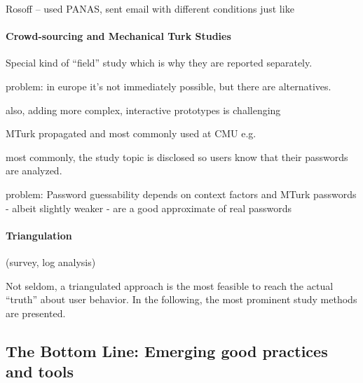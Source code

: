 Rosoff \etal \cite{Rosoff2014BehavioralExperimentsFraud} -- used PANAS, sent email with different conditions just like \cite{Huh2017TooBusy}


\paragraph{Crowd-sourcing and Mechanical Turk Studies}
Special kind of ``field'' study which is why they are reported separately.

problem: in europe it's not immediately possible, but there are alternatives. 

also, adding more complex, interactive prototypes is challenging

\cite{Peer2017BeyondTheTurk}
\cite{Ross2010WhoAreTurkers}
\cite{Savage2012GainingWisdomCrowds}

MTurk
propagated and most commonly used at CMU e.g. \cite{Mazurek2013Measuring} \cite{Shay2014CanLongPasswordsBeSecureAndUsable} \cite{Shay2016DesigningPasswordPolicies}
\cite{Shay2015UsablePoliciesMTurk}
\cite{Ur2016PerceptionsPassword} \cite{Melicher2016UsabilityMobileTextPasswords} \cite{Ur2017DataDrivenPWMeter}

most commonly, the study topic is disclosed so users know that their passwords are analyzed. 

\cite{Huha2015UserReplaceablePasswords}

problem:
Password guessability depends on context factors and MTurk passwords - albeit slightly weaker - are a good approximate of real passwords \cite{Mazurek2013Measuring}


\paragraph{Triangulation}
(survey, log analysis) \cite{Wash2016UnderstandingPasswordChoices}

Not seldom, a triangulated approach is the most feasible to reach the actual ``truth'' about user behavior. In the following, the most prominent study methods are presented. 


\subsection{The Bottom Line: Emerging good practices and tools}

